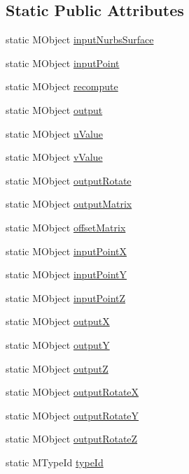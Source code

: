 \subsection*{Static Public Attributes}
\begin{DoxyCompactItemize}
\item 
static M\-Object \hyperlink{class_m_g__nurbs_rivet_a4360c781254c835e560f7c78ef9e6481}{input\-Nurbs\-Surface}
\item 
static M\-Object \hyperlink{class_m_g__nurbs_rivet_a29e50ce621268c3947f456f3e43bfa25}{input\-Point}
\item 
static M\-Object \hyperlink{class_m_g__nurbs_rivet_a7aeccbeeb51f51b5bef973f01103e6b9}{recompute}
\item 
static M\-Object \hyperlink{class_m_g__nurbs_rivet_ac3d5177a9758f3b3ad1b61cad032229e}{output}
\item 
static M\-Object \hyperlink{class_m_g__nurbs_rivet_a2531bc3b5ef7d7585fcf8a3b3435590e}{u\-Value}
\item 
static M\-Object \hyperlink{class_m_g__nurbs_rivet_a3ed59e29adcdbf204f407f08fe3b16b5}{v\-Value}
\item 
static M\-Object \hyperlink{class_m_g__nurbs_rivet_a446ab71986b82fe1e09210e5f467e010}{output\-Rotate}
\item 
static M\-Object \hyperlink{class_m_g__nurbs_rivet_a5dc9d6a6ed4f7e24425c3f25f934eead}{output\-Matrix}
\item 
static M\-Object \hyperlink{class_m_g__nurbs_rivet_a540b3de13a7788eec9d1c08973bb1515}{offset\-Matrix}
\item 
static M\-Object \hyperlink{class_m_g__nurbs_rivet_a5c09cb3fe1b1eb73e8f75176b8e7b723}{input\-Point\-X}
\item 
static M\-Object \hyperlink{class_m_g__nurbs_rivet_a9d55b7bdff71504f9531f8924cfc7d10}{input\-Point\-Y}
\item 
static M\-Object \hyperlink{class_m_g__nurbs_rivet_acd26e9adfc47fe51b82fe0f6c8ae9bb3}{input\-Point\-Z}
\item 
static M\-Object \hyperlink{class_m_g__nurbs_rivet_a4166483abd2b8b57483d81dbc97f3de5}{output\-X}
\item 
static M\-Object \hyperlink{class_m_g__nurbs_rivet_a9dacbb8116714802ee9eb28176a1e38c}{output\-Y}
\item 
static M\-Object \hyperlink{class_m_g__nurbs_rivet_a923a0bc4a7e64e2a6179e7d55cffd2a9}{output\-Z}
\item 
static M\-Object \hyperlink{class_m_g__nurbs_rivet_a55491d93e5402c09f4463e8729a83c57}{output\-Rotate\-X}
\item 
static M\-Object \hyperlink{class_m_g__nurbs_rivet_a36757fb01097b3063e8ab7e09d33b104}{output\-Rotate\-Y}
\item 
static M\-Object \hyperlink{class_m_g__nurbs_rivet_aa561c384be7c4fc5634436c491af7aef}{output\-Rotate\-Z}
\item 
static M\-Type\-Id \hyperlink{class_m_g__nurbs_rivet_a0d32f63265a10d14a34eb6a6e3c8a355}{type\-Id}
\end{DoxyCompactItemize}



